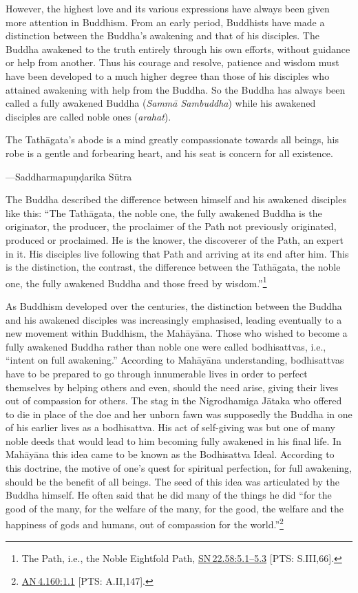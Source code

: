 \documentclass[10pt, openright]{book}
\newenvironment{epigram-2}%
{%
\setstretch{1.4}
\vspace{1em}
\noindent
\quoting[leftmargin=2cm,rightmargin=2cm]%
\begin{itshape}
\large
}%
{\end{itshape}\endquoting
}%
\newenvironment{epigram-2-cite}%
{%
\quoting[leftmargin=2cm,rightmargin=2cm]%
\noindent\normal\hspace*{\fill} 
}%
{\endquoting
}%
\begin{document}
However, the highest love and its various expressions have always been given more attention in Buddhism. From an early period, Buddhists have made a distinction between the Buddha’s awakening and that of his disciples. The Buddha awakened to the truth entirely through his own efforts, without guidance or help from another. Thus his courage and resolve, patience and wisdom must have been developed to a much higher degree than those of his disciples who attained awakening with help from the Buddha. So the Buddha has always been called a fully awakened Buddha (\textit{Sammā Sambuddha}) while his awakened disciples are called noble ones (\textit{arahat}).


\begin{epigram-2}
The Tathāgata’s abode is a mind greatly compassionate towards all beings, his robe is a gentle and forbearing heart, and his seat is concern for all existence.
\end{epigram-2}
\begin{epigram-2-cite}
—Saddharmapuṇḍarika Sūtra
\end{epigram-2-cite}

The Buddha described the difference between himself and his awakened disciples like this: “The Tathāgata, the noble one, the fully awakened Buddha is the originator, the producer, the proclaimer of the Path not previously originated, produced or proclaimed. He is the knower, the discoverer of the Path, an expert in it. His disciples live following that Path and arriving at its end after him. This is the distinction, the contrast, the difference between the Tathāgata, the noble one, the fully awakened Buddha and those freed by wisdom.”\footnote {The Path, i.e., the Noble Eightfold Path, \href{https://suttacentral.net/sn22.58/en/sujato\#5.1}{SN 22.58:5.1–5.3} [PTS: S.III,66].}


As Buddhism developed over the centuries, the distinction between the Buddha and his awakened disciples was increasingly emphasised, leading eventually to a new movement within Buddhism, the Mahāyāna. Those who wished to become a fully awakened Buddha rather than noble one were called bodhisattvas, i.e., “intent on full awakening.” According to Mahāyāna understanding, bodhisattvas have to be prepared to go through innumerable lives in order to perfect themselves by helping others and even, should the need arise, giving their lives out of compassion for others. The stag in the Nigrodhamiga Jātaka who offered to die in place of the doe and her unborn fawn was supposedly the Buddha in one of his earlier lives as a bodhisattva. His act of self-giving was but one of many noble deeds that would lead to him becoming fully awakened in his final life. In Mahāyāna this idea came to be known as the Bodhisattva Ideal. According to this doctrine, the motive of one’s quest for spiritual perfection, for full awakening, should be the benefit of all beings. The seed of this idea was articulated by the Buddha himself. He often said that he did many of the things he did “for the good of the many, for the welfare of the many, for the good, the welfare and the happiness of gods and humans, out of compassion for the world.”\footnote {\href{https://suttacentral.net/an4.160/en/sujato\#1.1}{AN 4.160:1.1} [PTS: A.II,147].}
\end{document}
